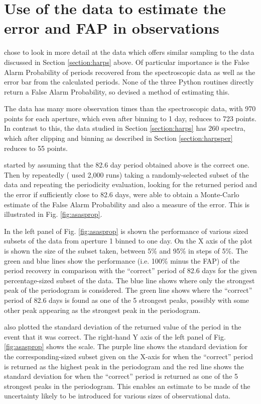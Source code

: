 \section{Use of the {\asas} data to estimate the error and FAP in {\harps} observations}
\protect\label{section:asasfap}

{\FirstP} chose to look in more detail at the {\asas} data which offers similar sampling to the {\harps} data discussed
in Section \ref{section:harps} above. Of particular importance is the False Alarm Probability of periods recovered from
the spectroscopic data as well as the error bar from the calculated periods. None of the three Python routines directly
return a False Alarm Probability, so {\Firstp} devised a method of estimating this.

The {\asas} data has many more observation times than the spectroscopic data, with 970 points for each aperture, which
even after binning to 1 day, reduces to 723 points. In contrast to this, the {\harps} data studied in Section
\ref{section:harps} has 260 spectra, which after clipping and binning as described in Section \ref{section:harpsper}
reduces to 55 points.

{\FirstP} started by assuming that the 82.6 day period obtained above is the correct one. Then by repeatedly ({\Firstp}
used 2,000 runs) taking a randomly-selected subset of the {\asas} data and repeating the periodicity evaluation, looking
for the returned period and the error if sufficiently close to 82.6 days, {\Firstp} were able to obtain a Monte-Carlo
estimate of the False Alarm Probability and also a measure of the error. This is illustrated in Fig. \ref{fig:asasprop}.

In the left panel of Fig. \ref{fig:asasprop} is shown the performance of various sized subsets of the {\asas} data from
aperture 1 binned to one day.  On the X axis of the plot is shown the size of the subset taken, between 5\% and 95\% in
steps of 5\%. The green and blue lines show the performance (i.e. 100\% minus the FAP) of the period recovery in
comparison with the ``correct'' period of 82.6 days for the given percentage-sized subset of the data. The blue line
shows where only the strongest peak of the periodogram is considered. The green line shows where the ``correct'' period
of 82.6 days is found as one of the 5 strongest peaks, possibly with some other peak appearing as the strongest peak in
the periodogram.

{\FirstP} also plotted the standard deviation of the returned value of the period in the event that it was correct. The
right-hand Y axis of the left panel of Fig. \ref{fig:asasprop} shows the scale. The purple line shows the standard
deviation for the corresponding-sized subset given on the X-axis for when the ``correct'' period is returned as the
highest peak in the periodogram and the red line shows the standard deviation for when the ``correct'' period is returned
as one of the 5 strongest peaks in the periodogram. This enables an estimate to be made of the uncertainty likely to be
introduced for various sizes of observational data.

